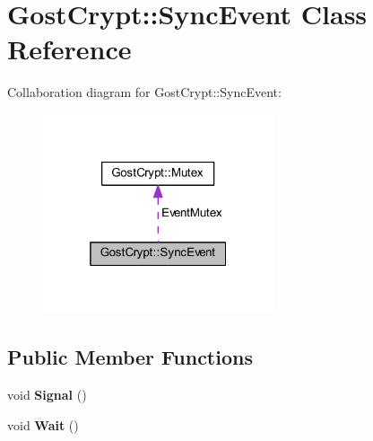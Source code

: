 \hypertarget{class_gost_crypt_1_1_sync_event}{}\section{Gost\+Crypt\+:\+:Sync\+Event Class Reference}
\label{class_gost_crypt_1_1_sync_event}


Collaboration diagram for Gost\+Crypt\+:\+:Sync\+Event\+:
\nopagebreak
\begin{figure}[H]
\begin{center}
\leavevmode
\includegraphics[width=193pt]{class_gost_crypt_1_1_sync_event__coll__graph}
\end{center}
\end{figure}
\subsection*{Public Member Functions}
\begin{DoxyCompactItemize}
\item 
\mbox{\label{class_gost_crypt_1_1_sync_event_ac701ce07364a56edf6c170ce83caea21}} 
void {\bfseries Signal} ()
\item 
\mbox{\label{class_gost_crypt_1_1_sync_event_ab545e197f675fd75fe68dc852863baa9}} 
void {\bfseries Wait} ()
\end{DoxyCompactItemize}
